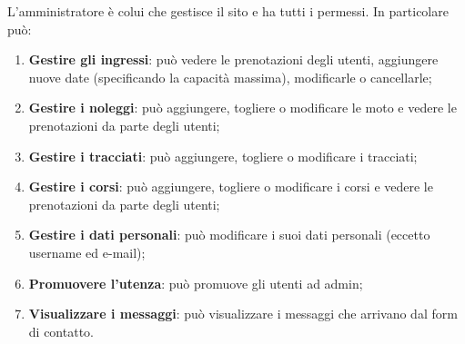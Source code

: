 L'amministratore è colui che gestisce il sito e ha tutti i permessi.
In particolare può:
\begin{enumerate}
    \item \textbf{Gestire gli ingressi}: può vedere le prenotazioni degli utenti, aggiungere nuove date (specificando la capacità massima), modificarle o cancellarle;
    \item \textbf{Gestire i noleggi}: può aggiungere, togliere o modificare le moto e vedere le prenotazioni da parte degli utenti;
    \item \textbf{Gestire i tracciati}: può aggiungere, togliere o modificare i tracciati;
    \item \textbf{Gestire i corsi}: può aggiungere, togliere o modificare i corsi e vedere le prenotazioni da parte degli utenti;
    \item \textbf{Gestire i dati personali}: può modificare i suoi dati personali (eccetto username ed e-mail);
    \item \textbf{Promuovere l'utenza}: può promuove gli utenti ad admin;
    \item \textbf{Visualizzare i messaggi}: può visualizzare i messaggi che arrivano dal form di contatto.
\end{enumerate}